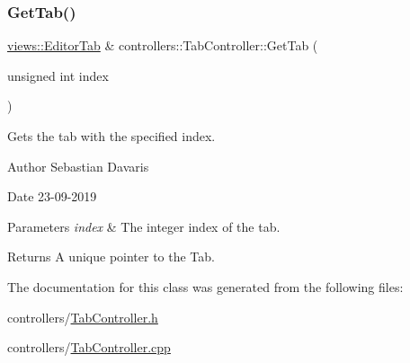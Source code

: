 \subsubsection{\texorpdfstring{Get\+Tab()}{GetTab()}}
{\footnotesize\ttfamily \hyperlink{classviews_1_1_editor_tab}{views\+::\+Editor\+Tab} \& controllers\+::\+Tab\+Controller\+::\+Get\+Tab (\begin{DoxyParamCaption}\item[{unsigned int}]{index }\end{DoxyParamCaption})}

Gets the tab with the specified index. \begin{DoxyAuthor}{Author}
Sebastian Davaris 
\end{DoxyAuthor}
\begin{DoxyDate}{Date}
23-\/09-\/2019 
\end{DoxyDate}

\begin{DoxyParams}{Parameters}
{\em index} & The integer index of the tab. \\
\hline
\end{DoxyParams}
\begin{DoxyReturn}{Returns}
A unique pointer to the Tab. 
\end{DoxyReturn}


The documentation for this class was generated from the following files\+:\begin{DoxyCompactItemize}
\item 
controllers/\hyperlink{_tab_controller_8h}{Tab\+Controller.\+h}\item 
controllers/\hyperlink{_tab_controller_8cpp}{Tab\+Controller.\+cpp}\end{DoxyCompactItemize}
